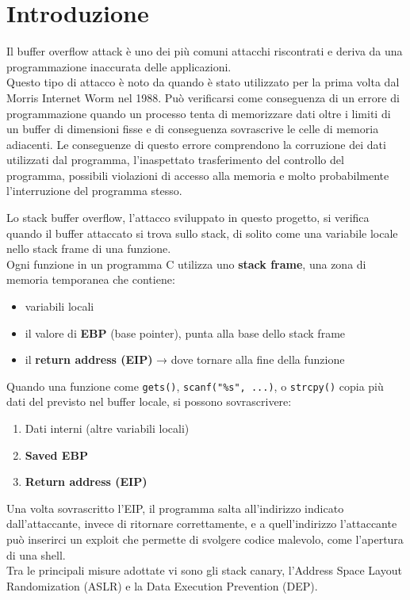 \documentclass[main.tex]{subfiles}
\begin{document}
\section{Introduzione}\label{sec:introduction}

Il buffer overflow attack è uno dei più comuni attacchi riscontrati e deriva da una programmazione inaccurata delle applicazioni.\\ 
Questo tipo di attacco è noto da quando è stato utilizzato per la prima volta dal Morris Internet Worm nel 1988.
Può verificarsi come conseguenza di un errore di programmazione quando un processo tenta di memorizzare dati oltre i limiti di un buffer di dimensioni fisse e di conseguenza sovrascrive le celle di memoria adiacenti.
Le conseguenze di questo errore comprendono la corruzione dei dati utilizzati dal programma, l'inaspettato trasferimento del controllo del programma, possibili violazioni di accesso alla memoria e molto probabilmente l'interruzione del programma stesso.

\noindent Lo stack buffer overflow, l'attacco sviluppato in questo progetto, si verifica quando il buffer attaccato si trova sullo stack, di solito come una variabile locale nello stack frame di una funzione.\\
Ogni funzione in un programma C utilizza uno \textbf{stack frame}, una zona di memoria temporanea che contiene:
\begin{itemize}
    \item variabili locali
    \item il valore di \textbf{EBP} (base pointer), punta alla base dello stack frame
    \item il \textbf{return address (EIP)} → dove tornare alla fine della funzione
\end{itemize}

\noindent Quando una funzione come \verb|gets()|, \verb|scanf("%s", ...)|, o \verb|strcpy()| copia più dati del previsto nel buffer locale, si possono sovrascrivere:

\begin{enumerate}
    \item Dati interni (altre variabili locali)
    \item \textbf{Saved EBP}
    \item \textbf{Return address (EIP)}
\end{enumerate}
Una volta sovrascritto l’EIP, il programma salta all’indirizzo indicato dall’attaccante, invece di ritornare correttamente, e a quell'indirizzo l'attaccante può inserirci un exploit che permette di svolgere codice malevolo, come l'apertura di una shell.\\
Tra le principali misure adottate vi sono gli stack canary, l'Address Space Layout Randomization (ASLR) e la Data Execution Prevention (DEP).
\end{document}
